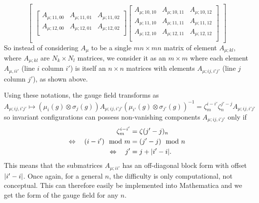 {\begin{equation}
\begin{bmatrix}
\begin{bmatrix}
                    A_{\mu;11,00} & A_{\mu;11,01} & A_{\mu;11,02}\\
                    A_{\mu;12,00} & A_{\mu;12,01} & A_{\mu;12,02}\\
                \end{bmatrix}
                \begin{bmatrix}
                A_{\mu;10,10} & A_{\mu;10,11} & A_{\mu;10,12}\\
                A_{\mu;11,10} & A_{\mu;11,11} & A_{\mu;11,12}\\
                A_{\mu;12,10} & A_{\mu;12,11} & A_{\mu;12,12}\\
            \end{bmatrix}
            \end{bmatrix}
        \end{equation}}
        So instead of considering $A_\mu$ to be a single $mn\times mn$ matrix of element $A_{\mu;kl}$, where $A_{\mu;kl}$ are $N_k\times N_l$ matrices, we consider it as an $m\times m$ where each element $A_{\mu,ii'}$ (line $i$ column $i'$) is itself an $n\times n$ matrices with elements $A_{\mu;ij,i'j'}$ (line $j$ column $j'$), as shown above.

        Using these notations, the gauge field transforms as
        \begin{equation}
            A_{\mu;ij,i'j'} \mapsto (\mu_i(g)\otimes\sigma_j(g))A_{\mu;ij,i'j'}(\mu_{i'}(g)\otimes\sigma_{j'}(g))^{-1} = \zeta^{i-i'}_m\zeta^{j'-j}_n A_{\mu;ij,i'j'}
        \end{equation}
        so invariant configurations can possess non-vanishing components $A_{\mu;ij,i'j'}$ only if
        \begin{align}
            \zeta^{i-i'}_m &= \zeta(j'-j)_n \\
            \Leftrightarrow\quad (i-i')\mod m &= (j'-j)\mod n \\
            \Leftrightarrow\quad j' &= j+\abs{i'-i}.
        \end{align}
        This means that the submatrices $A_{\mu;ii'}$ has an off-diagonal block form with offset $\abs{i'-i}$. Once again, for a general $n$, the difficulty is only computational, not conceptual. This can therefore easily be implemented into Mathematica and we get the form of the gauge field for any $n$.

